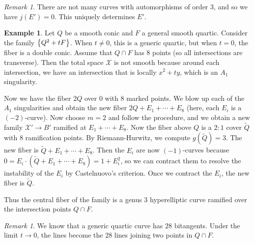 \documentclass[leqno, openany]{memoir}
\theoremstyle{definition}
\newtheorem{exm}[thm]{Example}
\theoremstyle{remark}
\newtheorem{rmk}[thm]{Remark}
\theoremstyle{plain}
\theoremstyle{definition}
\theoremstyle{remark}
\newcommand{\mc}[1]{\mathcal{#1}}
\newcommand{\wt}[1]{\widetilde{#1}}
\begin{document}
\begin{rmk}
    There are not many curves with automorphisms of order $3$, and so we have $j(E') = 0$. This uniquely determines $E'$.
\end{rmk}

\begin{exm}
    Let $Q$ be a smooth conic and $F$ a general smooth quartic. Consider the family $\qty{Q^2 + tF}$. When $t \neq 0$, this is a generic quartic, but when $t = 0$, the fiber is a double conic. Assume that $Q \cap F$ has $8$ points (so all intersections are transverse). Then the total space $\mc{X}$ is not smooth because around each intersection, we have an intersection that is locally $x^2 + ty$, which is an $A_1$ singularity. 

    Now we have the fiber $2Q$ over $0$ with $8$ marked points. We blow up each of the $A_1$ singularities and obtain the new fiber $2Q + E_1 + \cdots + E_8$ (here, each $E_i$ is a $(-2)$-curve). Now choose $m = 2$ and follow the procedure, and we obtain a new family $\mc{X}' \to B'$ ramified at $E_1 + \cdots + E_8$. Now the fiber above $Q$ is a $2:1$ cover $\wt{Q}$ with $8$ ramification points. By Riemann-Hurwitz, we compute $g(\wt{Q}) = 3$. The new fiber is $\wt{Q} + E_1 + \cdots + E_8$. Then the $E_i$ are now $(-1)$-curves because $0 = E_i \cdot (\wt{Q} + E_1 + \cdots + E_8) = 1 + E_i^2$, so we can contract them to resolve the instability of the $E_i$ by Castelnuovo's criterion. Once we contract the $E_i$, the new fiber is $\wt{Q}$.

    Thus the central fiber of the family is a genus $3$ hyperelliptic curve ramified over the intersection points $Q \cap F$.
\end{exm}

\begin{rmk}
    We know that a generic quartic curve has $28$ bitangents. Under the limit $t \to 0$, the lines become the $28$ lines joining two points in $Q \cap F$.
\end{rmk}
\end{document}
